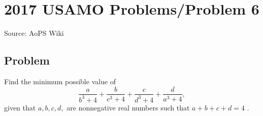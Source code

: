 \documentclass[12pt]{article}
\begin{document}
\section*{{2017 USAMO Problems/Problem 6}}
Source: AoPS Wiki

\subsection*{Problem}
Find the minimum possible value of \[\frac{a}{b^3+4}+\frac{b}{c^3+4}+\frac{c}{d^3+4}+\frac{d}{a^3+4},\] given that $a,b,c,d,$ are nonnegative real numbers such that $a+b+c+d=4$ .
\end{document}
